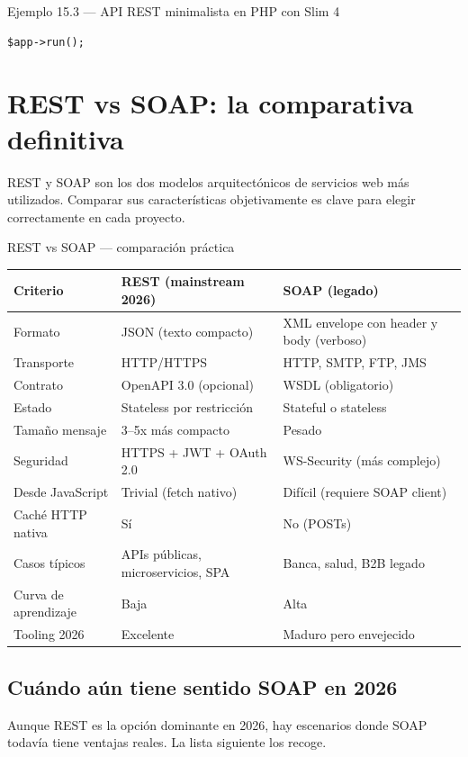 \documentclass[11pt,a4paper,openany]{book}
\begin{document}
\begin{cajaejemplo}{Ejemplo 15.3 --- API REST minimalista en PHP con Slim 4}
\begin{lstlisting}[style=php,caption={public/index.php},label=lst:15.5]
$app->run();
\end{lstlisting}
\end{cajaejemplo}

\section{REST vs SOAP: la comparativa definitiva}

REST y SOAP son los dos modelos arquitectónicos de servicios
web más utilizados. Comparar sus características objetivamente es
clave para elegir correctamente en cada proyecto.


\begin{cajacompara}{REST vs SOAP --- comparación práctica}
\centering\footnotesize
\begin{tabularx}{\textwidth}{lXX}
\toprule
\textbf{Criterio} & \textbf{REST (mainstream 2026)} & \textbf{SOAP (legado)}\\
\midrule
Formato & JSON (texto compacto) & XML envelope con header y body (verboso)\\
Transporte & HTTP/HTTPS & HTTP, SMTP, FTP, JMS\\
Contrato & OpenAPI 3.0 (opcional) & WSDL (obligatorio)\\
Estado & Stateless por restricción & Stateful o stateless\\
Tamaño mensaje & 3--5x más compacto & Pesado\\
Seguridad & HTTPS + JWT + OAuth 2.0 & WS-Security (más complejo)\\
Desde JavaScript & Trivial (fetch nativo) & Difícil (requiere SOAP client)\\
Caché HTTP nativa & Sí & No (POSTs)\\
Casos típicos & APIs públicas, microservicios, SPA & Banca, salud, B2B legado\\
Curva de aprendizaje & Baja & Alta\\
Tooling 2026 & Excelente & Maduro pero envejecido\\
\bottomrule
\end{tabularx}
\end{cajacompara}

\subsection{Cuándo aún tiene sentido SOAP en 2026}

Aunque REST es la opción dominante en 2026, hay escenarios
donde SOAP todavía tiene ventajas reales. La lista siguiente los
recoge.
\end{document}
